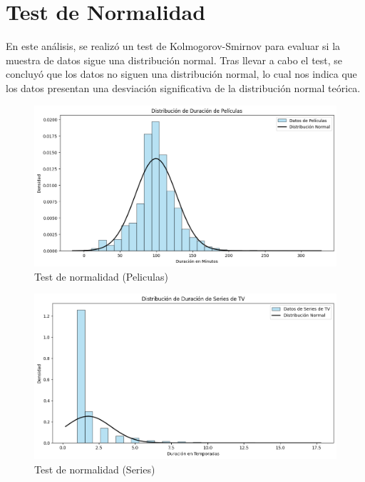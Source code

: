 \documentclass{article}
\begin{document}
\section{Test de Normalidad}
En este análisis, se realizó un test de Kolmogorov-Smirnov para evaluar si la muestra de datos sigue una distribución normal. Tras llevar a cabo el test, se concluyó que los datos no siguen una distribución normal, lo cual nos indica que los datos presentan una desviación significativa de la distribución normal teórica.

\begin{figure}[H]
    \centering
    \includegraphics[width=\textwidth]{Graphs/dist_duracion_peliculas.png}
    \caption{Test de normalidad (Peliculas)}
    \label{fig:dist_duracion_peliculas}
\end{figure}

\begin{figure}[H]
    \centering
    \includegraphics[width=\textwidth]{Graphs/dist_duracion_series.png}
    \caption{Test de normalidad (Series)}
    \label{fig:dist_duracion_series}
\end{figure}
\end{document}
